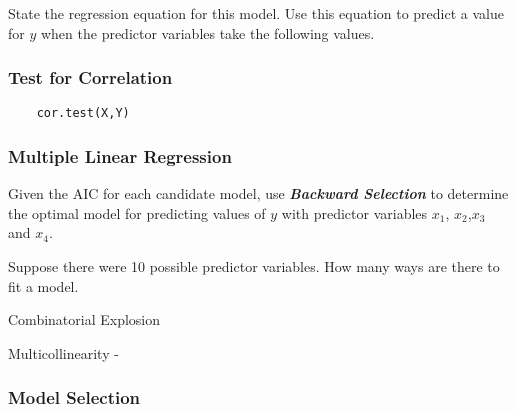 \documentclass[a4paper,12pt]{article}
\begin{document}



State the regression equation for this model.
Use this equation to predict a value for $y$ when the predictor variables take the following values.


\subsubsection*{Test for Correlation}

\begin{framed}
	\begin{verbatim}
	cor.test(X,Y)
	\end{verbatim}
\end{framed}

\newpage
\subsubsection*{Multiple Linear Regression}

Given the AIC for each candidate model, use \textbf{\textit{Backward Selection}} to determine the optimal model for predicting values of $y$ with predictor variables
$x_1$, $x_2$,$x_3$ and $x_4$.

Suppose there were 10 possible predictor variables. How many ways are there to fit a model.

Combinatorial Explosion

Multicollinearity - 


\newpage

	
	\newpage

\subsubsection*{Model Selection}
\end{document}
